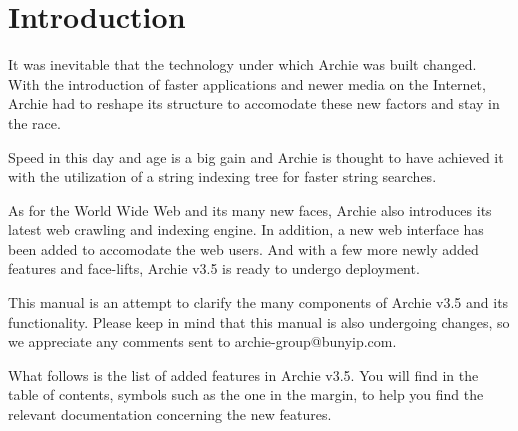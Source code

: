 %
%
%
%

\chapter{Introduction}

\setcounter{page}{1}


It was inevitable that the technology under which Archie was built changed.
With the introduction of faster applications and newer media on the Internet,
Archie had to reshape its structure to accomodate these new factors and
stay in the race.

Speed in this day and age is a big gain and Archie is thought to have
achieved it with the utilization of a string indexing tree for faster string
searches.

As for the World Wide Web and its many new faces, Archie also introduces its
latest web crawling and indexing engine.  In addition, a new web interface has
been added to accomodate the web users.  And with a few more newly added
features and face-lifts, Archie v3.5 is ready to undergo deployment.

This manual is an attempt to clarify the many components of Archie v3.5 and
its functionality.  Please keep in mind that this manual is also undergoing
changes, so we appreciate any comments sent to archie-group@bunyip.com.

What follows is the list of added features in Archie v3.5. You will find in
the table of contents, symbols such as the one in the margin, to help you
find the relevant documentation concerning the new features. \New

